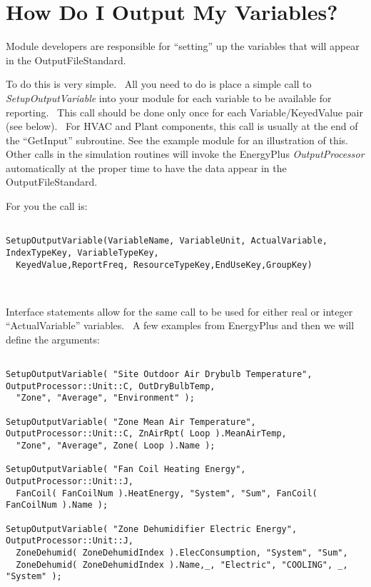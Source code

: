 \section{How Do I Output My Variables?}\label{how-do-i-output-my-variables}

Module developers are responsible for ``setting'' up the variables that will appear in the OutputFileStandard.

To do this is very simple.~ All you need to do is place a simple call to \emph{SetupOutputVariable} into your module for each variable to be available for reporting.~ This call should be done only once for each Variable/KeyedValue pair (see below).~ For HVAC and Plant components, this call is usually at the end of the ``GetInput'' subroutine. See the example module for an illustration of this. Other calls in the simulation routines will invoke the EnergyPlus \emph{OutputProcessor} automatically at the proper time to have the data appear in the OutputFileStandard.

For you the call is:

\begin{lstlisting}

SetupOutputVariable(VariableName, VariableUnit, ActualVariable, IndexTypeKey, VariableTypeKey, 
  KeyedValue,ReportFreq, ResourceTypeKey,EndUseKey,GroupKey)
  
  
\end{lstlisting}


Interface statements allow for the same call to be used for either real or integer ``ActualVariable'' variables.~ A few examples from EnergyPlus and then we will define the arguments:

\begin{lstlisting}

SetupOutputVariable( "Site Outdoor Air Drybulb Temperature", OutputProcessor::Unit::C, OutDryBulbTemp, 
  "Zone", "Average", "Environment" );
  
SetupOutputVariable( "Zone Mean Air Temperature", OutputProcessor::Unit::C, ZnAirRpt( Loop ).MeanAirTemp, 
  "Zone", "Average", Zone( Loop ).Name );
  
SetupOutputVariable( "Fan Coil Heating Energy", OutputProcessor::Unit::J, 
  FanCoil( FanCoilNum ).HeatEnergy, "System", "Sum", FanCoil( FanCoilNum ).Name );
  
SetupOutputVariable( "Zone Dehumidifier Electric Energy", OutputProcessor::Unit::J,
  ZoneDehumid( ZoneDehumidIndex ).ElecConsumption, "System", "Sum", 
  ZoneDehumid( ZoneDehumidIndex ).Name,_, "Electric", "COOLING", _, "System" );
  
\end{lstlisting}


